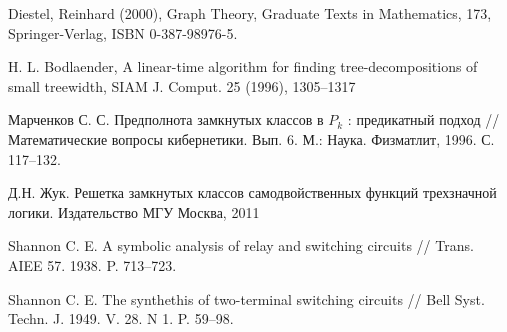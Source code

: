 \documentclass[12pt]{extarticle}
\begin{document}
Diestel, Reinhard (2000), Graph Theory, Graduate Texts in Mathematics, 
173, Springer-Verlag, ISBN 0-387-98976-5.

H. L. Bodlaender, A linear-time algorithm for finding 
tree-decompositions of small
treewidth, SIAM J. Comput. 25 (1996), 1305–1317

Марченков С. С. Предполнота замкнутых классов в $P_k$ : предикатный
подход // Математические вопросы кибернетики. Вып. 6. М.: Наука.
Физматлит, 1996. С. 117–132.

Д.Н. Жук. Решетка замкнутых классов самодвойственных функций трехзначной логики. Издательство МГУ Москва, 2011

Shannon C. E. A symbolic analysis of relay and switching circuits // Trans.
AIEE 57. 1938. P. 713–723.

Shannon C. E. The synthethis of two-terminal switching circuits // Bell
Syst. Techn. J. 1949. V. 28. N 1. P. 59–98.

\endthebibliography
\end{document}
